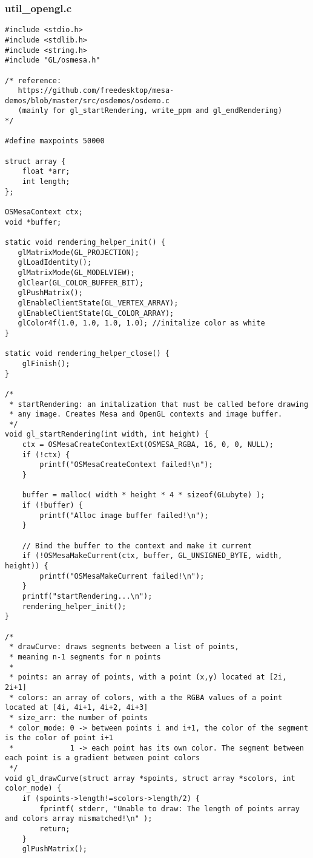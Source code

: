 \documentclass[main.tex]{subfiles}
\begin{document}
\subsubsection{util\_opengl.c}
\begin{lstlisting}
#include <stdio.h>
#include <stdlib.h>
#include <string.h>
#include "GL/osmesa.h"

/* reference: 
   https://github.com/freedesktop/mesa-demos/blob/master/src/osdemos/osdemo.c
   (mainly for gl_startRendering, write_ppm and gl_endRendering)
*/

#define maxpoints 50000

struct array {
    float *arr;
    int length;
};

OSMesaContext ctx;
void *buffer;

static void rendering_helper_init() {
   glMatrixMode(GL_PROJECTION);
   glLoadIdentity();
   glMatrixMode(GL_MODELVIEW);
   glClear(GL_COLOR_BUFFER_BIT);
   glPushMatrix();
   glEnableClientState(GL_VERTEX_ARRAY);
   glEnableClientState(GL_COLOR_ARRAY);
   glColor4f(1.0, 1.0, 1.0, 1.0); //initalize color as white
}

static void rendering_helper_close() {
    glFinish();
}

/*
 * startRendering: an initalization that must be called before drawing
 * any image. Creates Mesa and OpenGL contexts and image buffer.
 */
void gl_startRendering(int width, int height) {
    ctx = OSMesaCreateContextExt(OSMESA_RGBA, 16, 0, 0, NULL);
    if (!ctx) {
        printf("OSMesaCreateContext failed!\n");
    }

    buffer = malloc( width * height * 4 * sizeof(GLubyte) );
    if (!buffer) {
        printf("Alloc image buffer failed!\n");
    }

    // Bind the buffer to the context and make it current
    if (!OSMesaMakeCurrent(ctx, buffer, GL_UNSIGNED_BYTE, width, height)) {
        printf("OSMesaMakeCurrent failed!\n");
    }
    printf("startRendering...\n");
    rendering_helper_init();
}

/*
 * drawCurve: draws segments between a list of points,
 * meaning n-1 segments for n points
 *
 * points: an array of points, with a point (x,y) located at [2i, 2i+1]
 * colors: an array of colors, with a the RGBA values of a point located at [4i, 4i+1, 4i+2, 4i+3]
 * size_arr: the number of points
 * color_mode: 0 -> between points i and i+1, the color of the segment is the color of point i+1
 *             1 -> each point has its own color. The segment between each point is a gradient between point colors
 */
void gl_drawCurve(struct array *spoints, struct array *scolors, int color_mode) {
    if (spoints->length!=scolors->length/2) {
        fprintf( stderr, "Unable to draw: The length of points array and colors array mismatched!\n" );
        return;
    }
    glPushMatrix();
    

\end{lstlisting}
\end{document}
